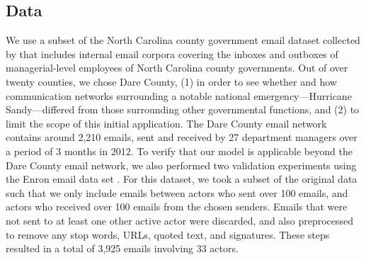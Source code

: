 \documentclass[twoside]{article}
\begin{document}
\subsection{Data}\label{subsec:Data}
We use a subset of the North Carolina county government email dataset collected by \citet{ben2017transparency} that includes internal email corpora covering the inboxes and outboxes of managerial-level employees of North Carolina county governments. Out of over twenty counties, we chose Dare County, (1) in order to see whether and how communication networks surrounding a notable national emergency---Hurricane Sandy---differed from those surrounding other governmental functions, and (2) to limit the scope of this initial application. The Dare County email network contains around 2,210 emails, sent and received by 27 department managers over a period of 3 months in 2012. To verify that our model is applicable beyond the Dare County email network, we also performed two validation experiments using the Enron email data set \citep{klimt2004introducing}. For this dataset, we took a subset of the original data such that we only include emails between actors who sent over 100 emails, and actors who received over 100 emails from the chosen senders. Emails that were not sent to at least one other active actor were discarded, and also preprocessed to remove any stop words, URLs, quoted text, and signatures. These steps resulted in a total of 3,925 emails involving 33 actors. 
\end{document}

